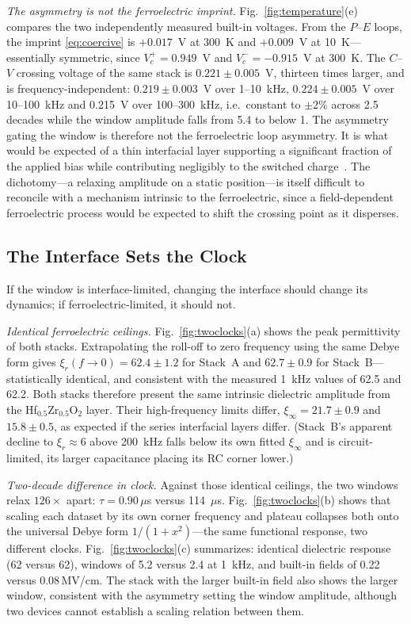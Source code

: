 \documentclass[journal]{IEEEtran}
\newcommand{\hzo}{Hf$_{0.5}$Zr$_{0.5}$O$_{2}$}
\newcommand{\xir}{\xi_{r}}
\newcommand{\MVcm}{\,MV/cm}
\begin{document}
\textit{The asymmetry is not the ferroelectric imprint.}
Fig.~\ref{fig:temperature}(e) compares the two independently measured
built-in voltages. From the $P$--$E$ loops, the imprint \eqref{eq:coercive}
is $+0.017$~V at 300~K and $+0.009$~V at 10~K---essentially symmetric, since
$V_c^{+} = 0.949$~V and $V_c^{-} = -0.915$~V at 300~K. The $C$--$V$ crossing
voltage of the same stack is $0.221 \pm 0.005$~V, thirteen times larger, and
is frequency-independent: $0.219 \pm 0.003$~V over 1--10~kHz,
$0.224 \pm 0.005$~V over 10--100~kHz and 0.215~V over 100--300~kHz, i.e.\
constant to $\pm2$\% across 2.5 decades while the window amplitude falls from
5.4 to below 1. The asymmetry gating the window is therefore not the
ferroelectric loop asymmetry. It is what would be expected of a thin
interfacial layer supporting a significant fraction of the applied bias while
contributing negligibly to the switched
charge~\cite{alcala2023,schenk2014apr,li2024imprint}. The dichotomy---a
relaxing amplitude on a static position---is itself difficult to reconcile
with a mechanism intrinsic to the ferroelectric, since a field-dependent
ferroelectric process would be expected to shift the crossing point as it
disperses.

\subsection{The Interface Sets the Clock}
If the window is interface-limited, changing the interface should change its
dynamics; if ferroelectric-limited, it should not.

\textit{Identical ferroelectric ceilings.} Fig.~\ref{fig:twoclocks}(a) shows
the peak permittivity of both stacks. Extrapolating the roll-off to zero
frequency using the same Debye form gives $\xir(f\!\rightarrow\!0) =
62.4 \pm 1.2$ for Stack~A and $62.7 \pm 0.9$ for Stack~B---statistically
identical, and consistent with the measured 1~kHz values of 62.5 and 62.2.
Both stacks therefore present the same intrinsic dielectric amplitude from
the \hzo{} layer. Their high-frequency limits differ,
$\xi_\infty = 21.7 \pm 0.9$ and $15.8 \pm 0.5$, as expected if the series
interfacial layers differ. (Stack~B's apparent decline to $\xir \approx 6$
above 200~kHz falls below its own fitted $\xi_\infty$ and is circuit-limited,
its larger capacitance placing its RC corner lower.)

\textit{Two-decade difference in clock.} Against those identical ceilings,
the two windows relax $126\times$ apart: $\tau = 0.90\,\mu$s versus
114~$\mu$s. Fig.~\ref{fig:twoclocks}(b) shows that scaling each dataset by
its own corner frequency and plateau collapses both onto the universal Debye
form $1/(1+x^2)$---the same functional response, two different clocks.
Fig.~\ref{fig:twoclocks}(c) summarizes: identical dielectric response (62
versus 62), windows of 5.2 versus 2.4 at 1~kHz, and built-in fields of 0.22
versus 0.08\MVcm{}. The stack with the larger built-in field also shows the
larger window, consistent with the asymmetry setting the window amplitude,
although two devices cannot establish a scaling relation between them.
\end{document}
